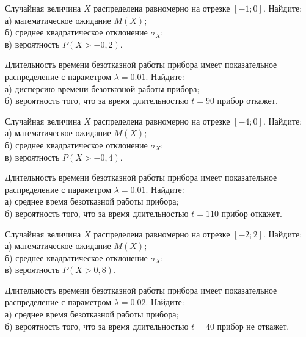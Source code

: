 \vfill

\newpage\setcounter{zad}{0}

\z Случайная величина $X$ распределена равномерно на отрезке $[-1; 0]$. Найдите: \\ \quad а) математическое ожидание $M(X)$; \\ \quad б) среднее квадратическое отклонение $\sigma_X$; \\ \quad в) вероятность $P(X>-0{,}2)$.


\vfill

\z Длительность времени безотказной работы прибора имеет показательное распределение с параметром $\lambda = 0.01$. Найдите: \\ \quad а) дисперсию времени безотказной работы прибора; \\ \quad б) вероятность того, что за время длительностью $t = 90$ прибор откажет.
 

\vfill

\newpage\setcounter{zad}{0}

\z Случайная величина $X$ распределена равномерно на отрезке $[-4; 0]$. Найдите: \\ \quad а) математическое ожидание $M(X)$; \\ \quad б) среднее квадратическое отклонение $\sigma_X$; \\ \quad в) вероятность $P(X>-0{,}4)$.


\vfill

\z Длительность времени безотказной работы прибора имеет показательное распределение с параметром $\lambda = 0.01$. Найдите: \\ \quad а) среднее время безотказной работы прибора; \\ \quad б) вероятность того, что за время длительностью $t = 110$ прибор откажет.
 

\vfill

\newpage\setcounter{zad}{0}

\z Случайная величина $X$ распределена равномерно на отрезке $[-2; 2]$. Найдите: \\ \quad а) математическое ожидание $M(X)$; \\ \quad б) среднее квадратическое отклонение $\sigma_X$; \\ \quad в) вероятность $P(X>0{,}8)$.


\vfill

\z Длительность времени безотказной работы прибора имеет показательное распределение с параметром $\lambda = 0.02$. Найдите: \\ \quad а) среднее время безотказной работы прибора; \\ \quad б) вероятность того, что за время длительностью $t = 40$ прибор не откажет.
 


